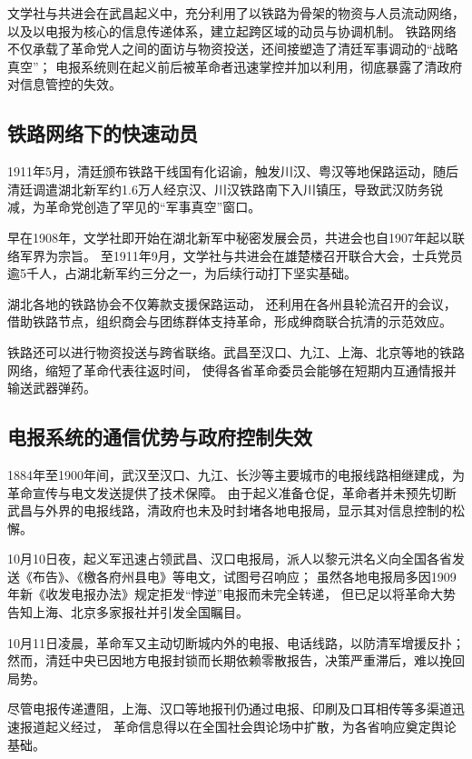 文学社与共进会在武昌起义中，充分利用了以铁路为骨架的物资与人员流动网络，以及以电报为核心的信息传递体系，建立起跨区域的动员与协调机制。
铁路网络不仅承载了革命党人之间的面访与物资投送，还间接塑造了清廷军事调动的“战略真空”；
电报系统则在起义前后被革命者迅速掌控并加以利用，彻底暴露了清政府对信息管控的失效。

\subsection{铁路网络下的快速动员}
1911年5月，清廷颁布铁路干线国有化诏谕，触发川汉、粤汉等地保路运动，随后清廷调遣湖北新军约1.6万人经京汉、川汉铁路南下入川镇压，导致武汉防务锐减，为革命党创造了罕见的“军事真空”窗口。

早在1908年，文学社即开始在湖北新军中秘密发展会员，共进会也自1907年起以联络军界为宗旨。
至1911年9月，文学社与共进会在雄楚楼召开联合大会，士兵党员逾5千人，占湖北新军约三分之一，为后续行动打下坚实基础\autocite{wiki}。

湖北各地的铁路协会不仅筹款支援保路运动，
还利用在各州县轮流召开的会议，借助铁路节点，组织商会与团练群体支持革命，形成绅商联合抗清的示范效应。

铁路还可以进行物资投送与跨省联络。武昌至汉口、九江、上海、北京等地的铁路网络，缩短了革命代表往返时间，
使得各省革命委员会能够在短期内互通情报并输送武器弹药。

\subsection{电报系统的通信优势与政府控制失效}
1884年至1900年间，武汉至汉口、九江、长沙等主要城市的电报线路相继建成，为革命宣传与电文发送提供了技术保障。
由于起义准备仓促，革命者并未预先切断武昌与外界的电报线路，清政府也未及时封堵各地电报局，显示其对信息控制的松懈。

10月10日夜，起义军迅速占领武昌、汉口电报局，派人以黎元洪名义向全国各省发送《布告》、《檄各府州县电》等电文，试图号召响应；
虽然各地电报局多因1909年新《收发电报办法》规定拒发“悖逆”电报而未完全转递，
但已足以将革命大势告知上海、北京多家报社并引发全国瞩目。

10月11日凌晨，革命军又主动切断城内外的电报、电话线路，以防清军增援反扑；
然而，清廷中央已因地方电报封锁而长期依赖零散报告，决策严重滞后，难以挽回局势。

尽管电报传递遭阻，上海、汉口等地报刊仍通过电报、印刷及口耳相传等多渠道迅速报道起义经过，
革命信息得以在全国社会舆论场中扩散，为各省响应奠定舆论基础。